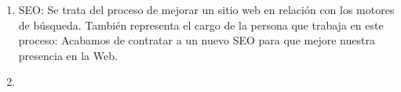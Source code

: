 

\begin{enumerate}
    \item SEO: Se trata del proceso de mejorar un sitio web en relación con los motores de búsqueda. También representa el cargo de la persona que trabaja en este proceso: Acabamos de contratar a un nuevo SEO para que mejore nuestra presencia en la Web. \cite{SEO}
    \item 
\end{enumerate}